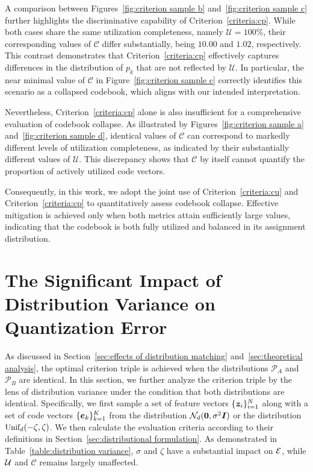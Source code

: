 A comparison between Figures~\ref{fig:criterion sample b} and~\ref{fig:criterion sample c} further highlights the discriminative capability of Criterion~\ref{criteria:cp}. While both cases share the same utilization completeness, namely $\mathcal{U}=100\%$, their corresponding values of $\mathcal{C}$ differ substantially, being $10.00$ and $1.02$, respectively. This contrast demonstrates that Criterion~\ref{criteria:cp} effectively captures differences in the distribution of $p_k$ that are not reflected by $\mathcal{U}$. In particular, the near minimal value of $\mathcal{C}$ in Figure~\ref{fig:criterion sample c} correctly identifies this scenario as a collapsed codebook, which aligns with our intended interpretation.

Nevertheless, Criterion~\ref{criteria:cp} alone is also insufficient for a comprehensive evaluation of codebook collapse. As illustrated by Figures~\ref{fig:criterion sample a} and~\ref{fig:criterion sample d}, identical values of $\mathcal{C}$ can correspond to markedly different levels of utilization completeness, as indicated by their substantially different values of $\mathcal{U}$. This discrepancy shows that $\mathcal{C}$ by itself cannot quantify the proportion of actively utilized code vectors.

Consequently, in this work, we adopt the joint use of Criterion~\ref{criteria:cu} and Criterion~\ref{criteria:cp} to quantitatively assess codebook collapse. Effective mitigation is achieved only when both metrics attain sufficiently large values, indicating that the codebook is both fully utilized and balanced in its assignment distribution.

\section{The Significant Impact of Distribution Variance on Quantization Error} 
\label{appendix:Impact of Distribution Variance}
As discussed in Section~\ref{sec:effects of distribution matching} and~\ref{sec:theoretical analysis}, the optimal criterion triple is achieved when the distributions $\mathcal{P}_A$ and $\mathcal{P}_B$ are identical. In this section, we further analyze the criterion triple by the lens of distribution variance under the condition that both distributions are identical. Specifically, we first sample a set of feature vectors $\{\bm{z}_i\}_{i=1}^N$ along with a set of code vectors $\{\bm{e}_k\}_{k=1}^K$ from the distribution $\mathcal{N}_d(\mathbf{0}, \sigma^2\bm I)$ or the distribution ${\textnormal{\small Unif}}_d(-\zeta, \zeta)$. We then calculate the evaluation criteria according to their definitions in Section~\ref{sec:distributional formulation}. As demonstrated in Table~\ref{table:distribution variance}, $\sigma$ and $\zeta$ have a substantial impact on $\mathcal{E}$, while $\mathcal{U}$ and $\mathcal{C}$ remains largely unaffected. 

